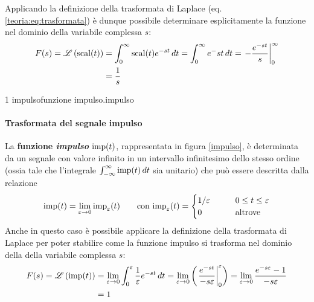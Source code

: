     Applicando la definizione della trasformata di Laplace (eq. \ref{teoria:eq:trasformata}) è dunque possibile determinare esplicitamente la funzione nel dominio della variabile complessa $s$:
    \begin{equation} \label{eq:trasf:scalino}
    \begin{aligned}
        F(s) = \mathscr L \left( \textrm{scal}(t) \right) & = \int_0^\infty \textrm{scal}(t) e^{-st} \, dt = \int_0^\infty e^-{st}\, dt = \left. - \frac{e^{-st}}{s} \right|_0^\infty \\ & = \frac{1}{s}
    \end{aligned}
    \end{equation}
    
	 1 {impulso}{funzione impulso.}{impulso}
	
	\paragraph{Trasformata del segnale impulso} La \textbf{funzione \textit{impulso}} $\textrm{imp}(t)$, rappresentata in figura \ref{impulso}, è determinata da un segnale con valore infinito in un intervallo infinitesimo dello stesso ordine (ossia tale che l'integrale $\int_{-\infty}^\infty \textrm{imp}(t)\, dt$ sia unitario) che può essere descritta dalla relazione
	\begin{equation}
	    \textrm{imp}(t) = \lim_{\varepsilon \rightarrow 0} \textrm{imp}_\varepsilon(t) \qquad \textrm{con } \textrm{imp}_\varepsilon(t) = \begin{cases}
	    1 / \varepsilon \qquad & 0 \leq t \leq \varepsilon \\ 0 & \textrm{altrove} 
	    \end{cases}
	\end{equation}
	Anche in questo caso è possibile applicare la definizione della trasformata di Laplace per poter stabilire come la funzione impulso si trasforma nel dominio della della variabile complessa $s$:
	\begin{equation} \label{eq:trasf:impulso}
	\begin{aligned}
	    F(s)=\mathscr L \left( \textrm{imp}(t) \right) &= \lim_{\varepsilon\rightarrow 0} \int_0^\varepsilon \frac 1 \varepsilon e^{-st} \, dt = \lim_{\varepsilon\rightarrow 0} \left( \left. \frac{e^{-st}}{-s\varepsilon} \right|_0^\varepsilon \right) = \lim_{\varepsilon\rightarrow 0} \frac{e^{-s\varepsilon} - 1}{-s\varepsilon} \\ & = 1
	\end{aligned}
	\end{equation}
	
